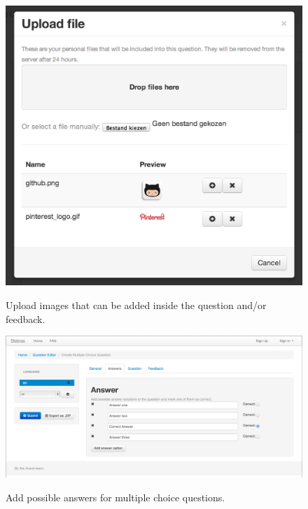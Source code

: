 \begin{section}
\begin{subsection}
        \begin{figure}[h!]
            \caption{Upload images that can be added inside the question and/or feedback.}
            \centering
            \includegraphics[width=1\textwidth]{img/upload}
            \label{qe-upload}
        \end{figure}
        
        \begin{figure}[h!]
            \caption{Add possible answers for multiple choice questions.}
            \centering
            \includegraphics[width=1\textwidth]{img/answers}
            \label{qe-answers}
        \end{figure}
    \end{subsection}  
\end{section}